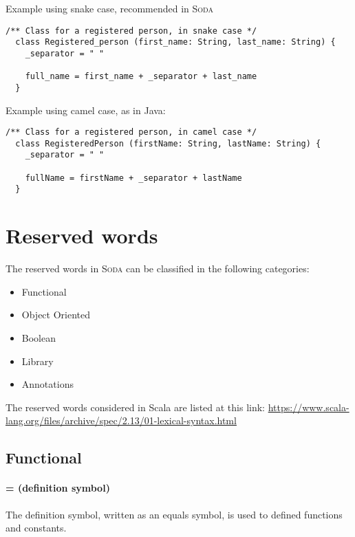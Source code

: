 \documentclass[12pt,a4paper]{book}
\newcommand{\Soda}{\textsc{Soda}\xspace}
\begin{document}
    Example using snake case, recommended in \Soda

    \begin{lstlisting}[label={lst:exampleExtendsSnakeCase}]
  /** Class for a registered person, in snake case */
  class Registered_person (first_name: String, last_name: String) {
    _separator = " "

    full_name = first_name + _separator + last_name
  }
    \end{lstlisting}

    Example using camel case, as in Java:
    \begin{lstlisting}[label={lst:exampleExtendsCamelCase}]
  /** Class for a registered person, in camel case */
  class RegisteredPerson (firstName: String, lastName: String) {
    _separator = " "

    fullName = firstName + _separator + lastName
  }
    \end{lstlisting}


    \chapter{Reserved words}

    The reserved words in \Soda can be classified in the following categories:

    \begin{itemize}
        \item Functional
        \item Object Oriented
        \item Boolean
        \item Library
        \item Annotations
    \end{itemize}


    The reserved words considered in Scala are listed at this link:
    \url{https://www.scala-lang.org/files/archive/spec/2.13/01-lexical-syntax.html}


    \section{Functional}

    \subsubsection{= (definition symbol)}

    The definition symbol, written as an equals symbol, is used to defined functions and constants.
\end{document}
